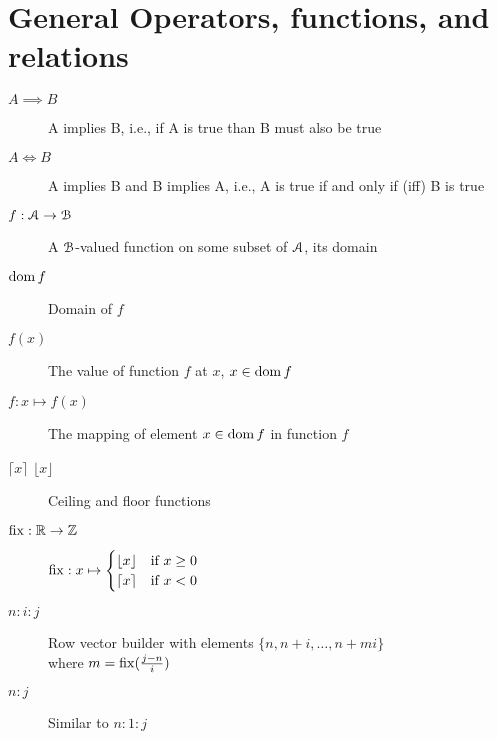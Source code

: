 \section*{General Operators, functions, and relations}
\begin{description}
  \item[$A\implies B$] A implies B, i.e., if A is true than B must also be true
  \item[$A\iff B$] A implies B and B implies A, i.e., A is true if and only if (iff) B is true
\item[$f:\mathcal{A}\to\mathcal{B}$] A $\mathcal{B}$-valued function on some subset of $\mathcal{A}$, its domain
\item[$\operatorname{dom} f$] Domain of $f$
\item[$f(x)$] The value of function $f$ at $x$, $x\in\operatorname{dom} f$
\item[$f:x\mapsto f(x)$] The mapping of element $x\in\operatorname{dom} f$ in function $f$
\item[$\lceil x\rceil$ $\lfloor x\rfloor$] Ceiling and floor functions
  \item[$\operatorname{fix}:\mathbb{R}\to\mathbb{Z}$] $\operatorname{fix}:x\mapsto
        \begin{cases}
          \lfloor x\rfloor&\text{if $x\geq0$}\\
          \lceil x\rceil&\text{if $x<0$}\\
        \end{cases}
        $
  \item[$n:i:j$] Row vector builder with elements ${\{n,n+i,\dots,n+mi\}}$
        \\where $m=\operatorname{fix}(\frac{j-n}{i})$
  \item[$n:j$] Similar to ${n:1:j}$
\end{description}

